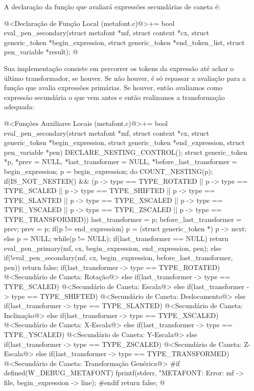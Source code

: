 {{{{{{A declaração da função que avaliará expressões secundárias de caneta
é:

\iniciocodigo
@<Declaração de Função Local (metafont.c)@>+=
bool eval_pen_secondary(struct metafont *mf, struct context *cx,
                        struct generic_token *begin_expression,
                        struct generic_token *end_token_list,
                        struct pen_variable *result);
@
\fimcodigo

Sua implementação consiste em percorrer os tokens da expressão até
achar o último transformador, se houver. Se não houver, é só repassar
a avaliação para a função que avalia expressões primárias. Se houver,
então avaliamos como expressão secundária o que vem antes e então
realizamos a transformação adequada:

\iniciocodigo
@<Funções Auxiliares Locais (metafont.c)@>+=
bool eval_pen_secondary(struct metafont *mf, struct context *cx,
                        struct generic_token *begin_expression,
                        struct generic_token *end_expression,
                        struct pen_variable *pen){
  DECLARE_NESTING_CONTROL();
  struct generic_token *p, *prev = NULL, *last_transformer = NULL,
                       *before_last_transformer = begin_expression;
  p = begin_expression;
  do{
    COUNT_NESTING(p);
    if(IS_NOT_NESTED() && (p -> type == TYPE_ROTATED ||
       p -> type == TYPE_SCALED || p -> type == TYPE_SHIFTED ||
       p -> type == TYPE_SLANTED || p -> type == TYPE_XSCALED ||
       p -> type == TYPE_YSCALED || p -> type == TYPE_ZSCALED ||
       p -> type == TYPE_TRANSFORMED)){
      last_transformer = p;
      before_last_transformer = prev;
    }
    prev = p;
    if(p != end_expression)
      p = (struct generic_token *) p -> next;
    else
      p = NULL;
  }while(p != NULL);
  if(last_transformer == NULL)
    return eval_pen_primary(mf, cx, begin_expression, end_expression, pen);
  else{
    if(!eval_pen_secondary(mf, cx, begin_expression, before_last_transformer, pen))
      return false;
    if(last_transformer -> type == TYPE_ROTATED){
      @<Secundário de Caneta: Rotação@>
    }
    else if(last_transformer -> type == TYPE_SCALED){
      @<Secundário de Caneta: Escala@>
    }
    else if(last_transformer -> type == TYPE_SHIFTED){
      @<Secundário de Caneta: Deslocamento@>
    }
    else if(last_transformer -> type == TYPE_SLANTED){
      @<Secundário de Caneta: Inclinação@>
    }
    else if(last_transformer -> type == TYPE_XSCALED){
      @<Secundário de Caneta: X-Escala@>
    }
    else if(last_transformer -> type == TYPE_YSCALED){
      @<Secundário de Caneta: Y-Escala@>
    }
    else if(last_transformer -> type == TYPE_ZSCALED){
      @<Secundário de Caneta: Z-Escala@>
    }
    else if(last_transformer -> type == TYPE_TRANSFORMED){
      @<Secundário de Caneta: Transformação Genérica@>
    }
#if defined(W_DEBUG_METAFONT)
    fprintf(stderr, "METAFONT: Error: %
            mf -> file, begin_expression -> line);
#endif
    return false;
  }
}
@
\fimcodigo

}}}}}}

